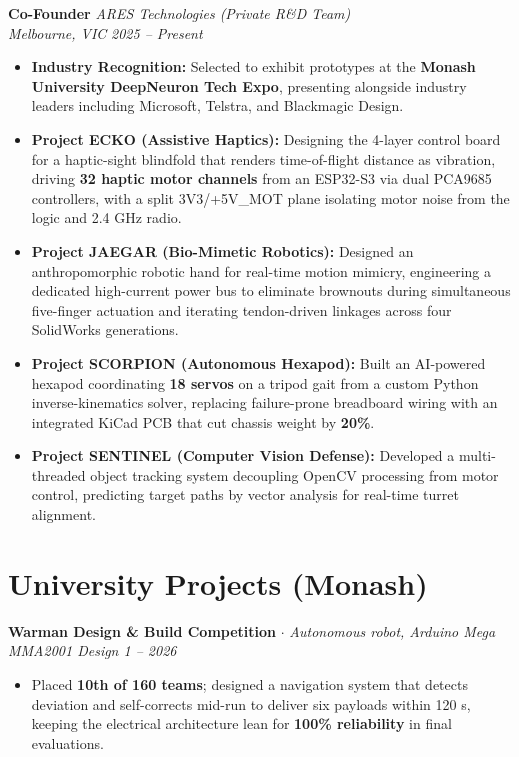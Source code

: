 \documentclass[10pt,a4paper]{article}
\begin{document}
\textbf{Co-Founder} \hfill \textit{ARES Technologies (Private R\&D Team)} \\
\textit{Melbourne, VIC} \hfill \textit{2025 -- Present}
\begin{itemize}[noitemsep, topsep=1pt, leftmargin=*]
    \item \textbf{Industry Recognition:} Selected to exhibit prototypes at the \textbf{Monash University DeepNeuron Tech Expo}, presenting alongside industry leaders including Microsoft, Telstra, and Blackmagic Design.
    \item \textbf{Project ECKO (Assistive Haptics):} Designing the 4-layer control board for a haptic-sight blindfold that renders time-of-flight distance as vibration, driving \textbf{32 haptic motor channels} from an ESP32-S3 via dual PCA9685 controllers, with a split 3V3/+5V\_MOT plane isolating motor noise from the logic and 2.4 GHz radio.
    \item \textbf{Project JAEGAR (Bio-Mimetic Robotics):} Designed an anthropomorphic robotic hand for real-time motion mimicry, engineering a dedicated high-current power bus to eliminate brownouts during simultaneous five-finger actuation and iterating tendon-driven linkages across four SolidWorks generations.
    \item \textbf{Project SCORPION (Autonomous Hexapod):} Built an AI-powered hexapod coordinating \textbf{18 servos} on a tripod gait from a custom Python inverse-kinematics solver, replacing failure-prone breadboard wiring with an integrated KiCad PCB that cut chassis weight by \textbf{20\%}.
    \item \textbf{Project SENTINEL (Computer Vision Defense):} Developed a multi-threaded object tracking system decoupling OpenCV processing from motor control, predicting target paths by vector analysis for real-time turret alignment.
\end{itemize}

\section{University Projects (Monash)}
\newcommand{\proj}[3]{\textbf{#1} $\cdot$ \textit{#2} \hfill \textit{#3}}

\proj{Warman Design \& Build Competition}{Autonomous robot, Arduino Mega}{MMA2001 Design 1 -- 2026}
\begin{itemize}[noitemsep, topsep=1pt, leftmargin=*]
    \item Placed \textbf{10th of 160 teams}; designed a navigation system that detects deviation and self-corrects mid-run to deliver six payloads within 120 s, keeping the electrical architecture lean for \textbf{100\% reliability} in final evaluations.
\end{itemize}
\end{document}
